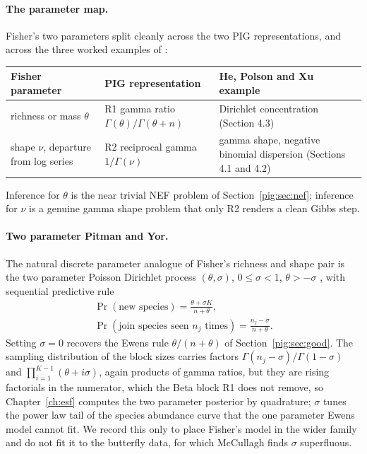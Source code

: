 \paragraph{The parameter map.} Fisher's two parameters split cleanly across the two PIG representations, and across the three worked examples of \citet{pig:he2022}:
\begin{center}
\footnotesize
\begin{tabular}{@{}>{\raggedright\arraybackslash}p{}>{\raggedright\arraybackslash}p{}>{\raggedright\arraybackslash}p{}@{}}
\toprule
Fisher parameter & PIG representation & He, Polson and Xu example\\
\midrule
richness or mass $\theta$ & R1 gamma ratio $\Gamma(\theta)/\Gamma(\theta+n)$ & Dirichlet concentration (Section 4.3)\\
shape $\nu$, departure from log series & R2 reciprocal gamma $1/\Gamma(\nu)$ & gamma shape, negative binomial dispersion (Sections 4.1 and 4.2)\\
\bottomrule
\end{tabular}
\end{center}
Inference for $\theta$ is the near trivial NEF problem of Section~\ref{pig:sec:nef}; inference for $\nu$ is a genuine gamma shape problem that only R2 renders a clean Gibbs step.

\paragraph{Two parameter Pitman and Yor.} The natural discrete parameter analogue of Fisher's richness and shape pair is the two parameter Poisson Dirichlet process $(\theta,\sigma)$, $0\le\sigma<1$, $\theta>-\sigma$ \citep{pig:pitman2006}, with sequential predictive rule
\begin{equation}\label{pig:eq:py}
\begin{gathered}
\Pr(\text{new species})=\frac{\theta+\sigma K}{n+\theta},\\
\Pr(\text{join species seen } n_j \text{ times})=\frac{n_j-\sigma}{n+\theta}.
\end{gathered}
\end{equation}
Setting $\sigma=0$ recovers the Ewens rule $\theta/(n+\theta)$ of Section~\ref{pig:sec:good}. The sampling distribution of the block sizes carries factors $\Gamma(n_j-\sigma)/\Gamma(1-\sigma)$ and $\prod_{i=1}^{K-1}(\theta+i\sigma)$, again products of gamma ratios, but they are rising factorials in the numerator, which the Beta block R1 does not remove, so Chapter~\ref{ch:esf} computes the two parameter posterior by quadrature; $\sigma$ tunes the power law tail of the species abundance curve that the one parameter Ewens model cannot fit. We record this only to place Fisher's model in the wider family and do not fit it to the butterfly data, for which McCullagh finds $\sigma$ superfluous.

